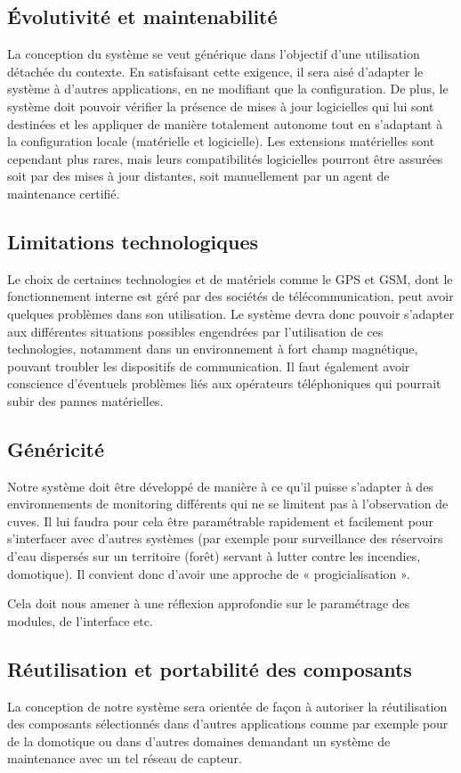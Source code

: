 \documentclass{mise_en_page}
\begin{document}
\subsection{Évolutivité et maintenabilité}
La conception du système se veut générique dans l’objectif d’une
utilisation détachée du contexte. En satisfaisant cette exigence, il
sera aisé d’adapter le système à d’autres applications, en ne modifiant
que la configuration. De plus, le système doit pouvoir vérifier la
présence de mises à jour logicielles qui lui sont destinées et les
appliquer de manière totalement autonome tout en s’adaptant à la
configuration locale (matérielle et logicielle). Les extensions
matérielles sont cependant plus rares, mais leurs compatibilités
logicielles pourront être assurées soit par des mises à jour distantes,
soit manuellement par un agent de maintenance certifié.

\subsection{Limitations technologiques}
Le choix de certaines technologies et de matériels comme le GPS et GSM,
dont le fonctionnement interne est géré par des sociétés de
télécommunication, peut avoir quelques problèmes dans son utilisation.
Le système devra donc pouvoir s’adapter aux différentes situations
possibles engendrées par l’utilisation de ces technologies, notamment
dans un environnement à fort champ magnétique, pouvant troubler les
dispositifs de communication. Il faut également avoir conscience
d’éventuels problèmes liés aux opérateurs téléphoniques qui pourrait
subir des pannes matérielles.

\subsection{Généricité}
Notre système doit être développé de manière à ce qu’il puisse s’adapter
à des environnements de monitoring différents qui ne se limitent pas à
l’observation de cuves. Il lui faudra pour cela être paramétrable
rapidement et facilement pour s’interfacer avec d’autres systèmes (par
exemple pour surveillance des réservoirs d’eau dispersés sur un
territoire (forêt) servant à lutter contre les incendies, domotique).
Il convient donc d’avoir une approche de « progicialisation ».

Cela doit nous amener à une réflexion approfondie sur le paramétrage des
modules, de l’interface etc.

\subsection{Réutilisation et portabilité des composants}
La conception de notre système sera orientée de façon à autoriser la
réutilisation des composants sélectionnés dans d’autres applications
comme par exemple pour de la domotique ou dans d’autres domaines
demandant un système de maintenance avec un tel réseau de capteur.
\end{document}
